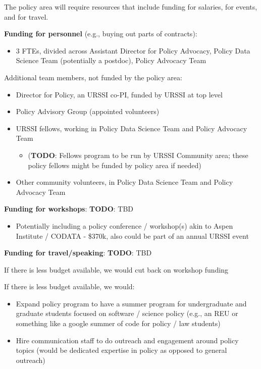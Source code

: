 \documentclass[
]{book}
\providecommand{\tightlist}{%
  \setlength{\itemsep}{0pt}\setlength{\parskip}{0pt}}
\begin{document}
The policy area will require resources that include funding for salaries, for events, and for travel.

\textbf{Funding for personnel} (e.g., buying out parts of contracts):

\begin{itemize}
\tightlist
\item
  3 FTEs, divided across Assistant Director for Policy Advocacy, Policy Data Science Team
  (potentially a postdoc), Policy Advocacy Team
\end{itemize}

Additional team members, not funded by the policy area:

\begin{itemize}
\tightlist
\item
  Director for Policy, an URSSI co-PI, funded by URSSI at top level
\item
  Policy Advisory Group (appointed volunteers)
\item
  URSSI fellows, working in Policy Data Science Team and Policy Advocacy Team

  \begin{itemize}
  \tightlist
  \item
    (\textbf{TODO}: Fellows program to be run by URSSI Community area; these policy fellows might
    be funded by policy area if needed)
  \end{itemize}
\item
  Other community volunteers, in Policy Data Science Team and Policy Advocacy Team
\end{itemize}

\textbf{Funding for workshops}: \textbf{TODO}: TBD

\begin{itemize}
\tightlist
\item
  Potentially including a policy conference / workshop(s) akin to Aspen Institute / CODATA - \$370k,
  also could be part of an annual URSSI event
\end{itemize}

\textbf{Funding for travel/speaking}: \textbf{TODO}: TBD

If there is less budget available, we would cut back on workshop funding

If there is less budget available, we would:

\begin{itemize}
\item
  Expand policy program to have a summer program for undergraduate and graduate students focused
  on software / science policy (e.g., an REU or something like a google summer of code for policy / law students)
\item
  Hire communication staff to do outreach and engagement around policy topics (would be dedicated
  expertise in policy as opposed to general outreach)
\end{itemize}
\end{document}
